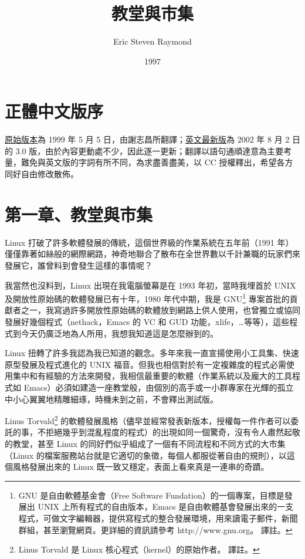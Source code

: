 \documentclass[10pt, b5paper]{book}
\title{教堂與市集}
\author{Eric Steven Raymond}
\date{1997}
\makeatletter
\newcommand*{\shifttext}[2]{%
  \settowidth{\@tempdima}{#2}%
  \makebox[\@tempdima]{\hspace*{#1}#2}%
}
\makeatother
\begin{document}
\maketitle

\newpage
\section{正體中文版序}

\href{http://www.linux.org.tw/CLDP/OLD/doc/Cathedral-Bazaar.html}{原始版本}為 1999 年 5 月 5
日，由謝志昌所翻譯；\href{http://www.catb.org/esr/writings/homesteading/cathedral-bazaar/}{英文最新版}為
2002 年 8 月 2 日的 3.0
版，由於內容更動處不少，因此逐一更新；翻譯以語句通順達意為主要考量，難免與英文版的字詞有所不同，為求盡善盡美，以
CC 授權釋出，希望各方同好自由修改散佈。

\newpage
\section{第一章、教堂與市集}

Linux 打破了許多軟體發展的傳統，這個世界級的作業系統在五年前（1991
年）僅僅靠著如絲般的網際網路，神奇地聯合了散布在全世界數以千計兼職的玩家們來發展它，誰曾料到會發生這樣的事情呢？

我當然也沒料到，Linux 出現在我電腦螢幕是在 1993 年初，當時我埋首於 UNIX
及開放性原始碼的軟體發展已有十年，1980 年代中期，我是 GNU\footnote{GNU
  是自由軟體基金會（Free Software Fundation）的一個專案，目標是發展出 UNIX
  上所有程式的自由版本，Emacs
  是自由軟體基會發展出來的一支程式，可做文字編輯器，提供寫程式的整合發展環境，用來讀電子郵件，新聞群組，甚至瀏覽網頁。更詳細的資訊請參考
  http://www.gnu.org。 \shifttext{1pt}{---}\shifttext{-1pt}{---} 譯註。}
專案首批的貢獻者之一，我寫過許多開放性原始碼的軟體放到網路上供人使用，也曾獨立或協同發展好幾個程式（nethack，Emacs
的 VC 和 GUD
功能，xlife，\ldots{}等等），這些程式到今天仍廣泛地為人所用，我想我知道這是怎麼辦到的。

Linux
扭轉了許多我認為我已知道的觀念。多年來我一直宣揚使用小工具集、快速原型發展及程式進化的
UNIX
福音。但我也相信對於有一定複雜度的程式必需使用集中和有經驗的方法來開發，我相信最重要的軟體（作業系統以及龐大的工具程式如
Emacs）必須如建造一座教堂般，由個別的高手或一小群專家在光輝的孤立中小心翼翼地精雕細琢，時機未到之前，不會釋出測試版。

Linus Torvald\footnote{Linus Torvald 是 Linux
  核心程式（kernel）的原始作者。 \shifttext{1pt}{---}\shifttext{-1pt}{---} 譯註。}
的軟體發展風格（儘早並經常發表新版本，授權每一件作者可以委託的事，不拒絕幾乎到混亂程度的程式）的出現如同一個驚奇，沒有令人肅然起敬的教堂，甚至
Linux 的同好們似乎組成了一個有不同流程和不同方式的大市集（Linux
的檔案服務站台就是它適切的象徵，每個人都服從著自由的規則），以這個風格發展出來的
Linux 既一致又穩定，表面上看來真是一連串的奇蹟。
\end{document}
